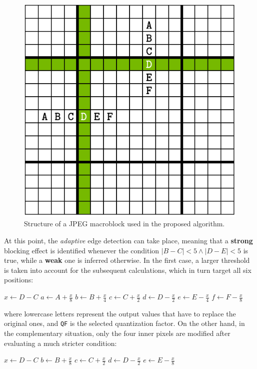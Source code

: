 \documentclass{article}
\begin{document}
\begin{figure}[!htbp]
  \centering
  \includegraphics[width=\textwidth]{macroblock.pdf}
  \caption{Structure of a JPEG macroblock used in the proposed algorithm.}
  \label{macroblock}
\end{figure}

At this point, the \textit{adaptive} edge detection can take place, meaning that a \textbf{strong} blocking effect is identified whenever the condition $|B-C|<5\wedge|D-E|<5$ is true, while a \textbf{weak} one is inferred otherwise. In the first case, a larger threshold is taken into account for the subsequent calculations, which in turn target all six positions:
\begin{algorithmic}
        \State $x\gets D-C$
        \State $a\gets A+\frac{x}{8}$
        \State $b\gets B+\frac{x}{4}$
        \State $c\gets C+\frac{x}{2}$
        \State $d\gets D-\frac{x}{2}$
        \State $e\gets E-\frac{x}{4}$
        \State $f\gets F-\frac{x}{8}$
    \EndIf
\end{algorithmic}
where lowercase letters represent the output values that have to replace the original ones, and \texttt{QF} is the selected quantization factor. On the other hand, in the complementary situation, only the four inner pixels are modified after evaluating a much stricter condition:
\begin{algorithmic}
        \State $x\gets D-C$
        \State $b\gets B+\frac{x}{8}$
        \State $c\gets C+\frac{x}{2}$
        \State $d\gets D-\frac{x}{2}$
        \State $e\gets E-\frac{x}{8}$
    \EndIf
\end{algorithmic}
\end{document}
